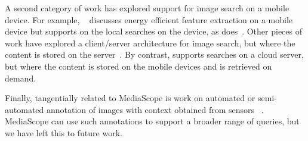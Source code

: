 
A second category of work has explored support for image search on a
mobile device.
%
For example, ~\cite{energy} discusses energy efficient feature
extraction on a mobile device but supports on the local searches on
the device, as does~\cite{fast}.
%
Other pieces of work have explored a client/server architecture for
image search, but where the content is stored on the
server~\cite{content1,content2,content3}.
%
By contrast, \mscope supports searches on a cloud server, but where
the content is stored on the mobile devices and is retrieved on
demand.

Finally, tangentially related to MediaScope is work on automated or
semi-automated annotation of images with context obtained from sensors
~\cite{MMM2,PhotoMap,TagSense}.
%
MediaScope can use such annotations to support a broader range of
queries, but we have left this to future work.



